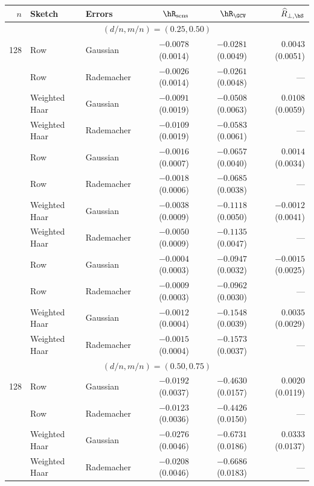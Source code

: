 \begin{tabular}{@{}rllrrr@{}}
\toprule
 $n$ & Sketch & Errors & $\hR_{\mathrm{sens}}$ & $\hR_{\GCV}$ & $\widehat R_{\perp,\bS}$ \\
\midrule
\multicolumn{6}{c}{$(d/n,m/n)=(0.25,0.50)$} \\
\midrule
128 & Row & Gaussian & $\mathbf{-0.0078}$ (0.0014) & $\mathbf{-0.0281}$ (0.0049) & $0.0043$ (0.0051) \\
 & Row & Rademacher & $-0.0026$ (0.0014) & $\mathbf{-0.0261}$ (0.0048) & --- \\
 & Weighted Haar & Gaussian & $\mathbf{-0.0091}$ (0.0019) & $\mathbf{-0.0508}$ (0.0063) & $0.0108$ (0.0059) \\
 & Weighted Haar & Rademacher & $\mathbf{-0.0109}$ (0.0019) & $\mathbf{-0.0583}$ (0.0061) & --- \\
\addlinespace[3pt]
256 & Row & Gaussian & $\mathbf{-0.0016}$ (0.0007) & $\mathbf{-0.0657}$ (0.0040) & $0.0014$ (0.0034) \\
 & Row & Rademacher & $\mathbf{-0.0018}$ (0.0006) & $\mathbf{-0.0685}$ (0.0038) & --- \\
 & Weighted Haar & Gaussian & $\mathbf{-0.0038}$ (0.0009) & $\mathbf{-0.1118}$ (0.0050) & $-0.0012$ (0.0041) \\
 & Weighted Haar & Rademacher & $\mathbf{-0.0050}$ (0.0009) & $\mathbf{-0.1135}$ (0.0047) & --- \\
\addlinespace[3pt]
512 & Row & Gaussian & $-0.0004$ (0.0003) & $\mathbf{-0.0947}$ (0.0032) & $-0.0015$ (0.0025) \\
 & Row & Rademacher & $\mathbf{-0.0009}$ (0.0003) & $\mathbf{-0.0962}$ (0.0030) & --- \\
 & Weighted Haar & Gaussian & $\mathbf{-0.0012}$ (0.0004) & $\mathbf{-0.1548}$ (0.0039) & $0.0035$ (0.0029) \\
 & Weighted Haar & Rademacher & $\mathbf{-0.0015}$ (0.0004) & $\mathbf{-0.1573}$ (0.0037) & --- \\
\midrule
\multicolumn{6}{c}{$(d/n,m/n)=(0.50,0.75)$} \\
\midrule
128 & Row & Gaussian & $\mathbf{-0.0192}$ (0.0037) & $\mathbf{-0.4630}$ (0.0157) & $0.0020$ (0.0119) \\
 & Row & Rademacher & $\mathbf{-0.0123}$ (0.0036) & $\mathbf{-0.4426}$ (0.0150) & --- \\
 & Weighted Haar & Gaussian & $\mathbf{-0.0276}$ (0.0046) & $\mathbf{-0.6731}$ (0.0186) & $\mathbf{0.0333}$ (0.0137) \\
 & Weighted Haar & Rademacher & $\mathbf{-0.0208}$ (0.0046) & $\mathbf{-0.6686}$ (0.0183) & --- \\

\end{tabular}
